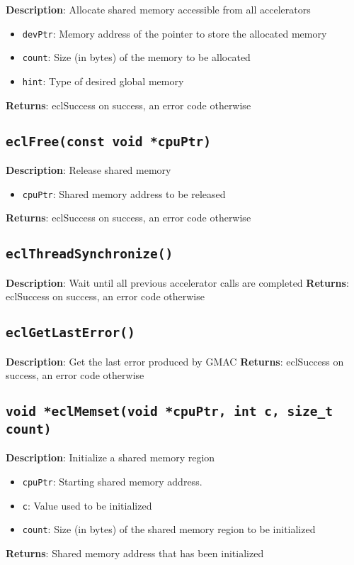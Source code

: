 \textbf{Description}: Allocate shared memory accessible from all accelerators
\begin{itemize}
  \item \texttt{devPtr}: Memory address of the pointer to store the allocated memory
  \item \texttt{count}: Size (in bytes) of the memory to be allocated
  \item \texttt{hint}: Type of desired global memory
\end{itemize}
\textbf{Returns}: eclSuccess on success, an error code otherwise

\subsection{\texttt{eclFree(const void *cpuPtr)}}

\textbf{Description}: Release shared memory
\begin{itemize}
  \item \texttt{cpuPtr}: Shared memory address to be released
\end{itemize}
\textbf{Returns}: eclSuccess on success, an error code otherwise

\subsection{\texttt{eclThreadSynchronize()}}

\textbf{Description}: Wait until all previous accelerator calls are completed
\textbf{Returns}: eclSuccess on success, an error code otherwise

\subsection{\texttt{eclGetLastError()}}

\textbf{Description}: Get the last error produced by GMAC
\textbf{Returns}: eclSuccess on success, an error code otherwise

\subsection{\texttt{void *eclMemset(void *cpuPtr, int c, size\_t count)}}

\textbf{Description}: Initialize a shared memory region
\begin{itemize}
  \item \texttt{cpuPtr}: Starting shared memory address.
  \item \texttt{c}: Value used to be initialized
  \item \texttt{count}: Size (in bytes) of the shared memory region to be initialized
\end{itemize}
\textbf{Returns}: Shared memory address that has been initialized

